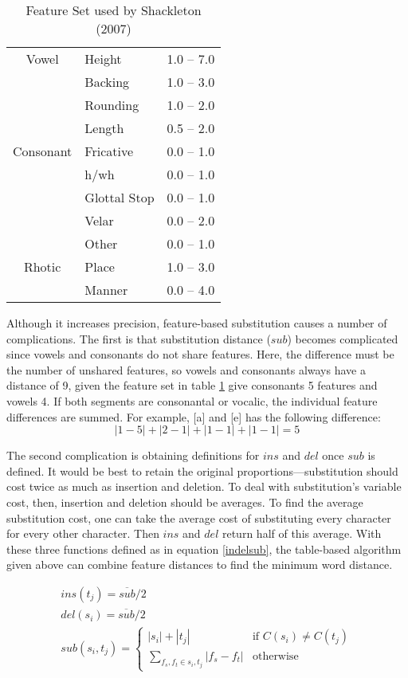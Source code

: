 \documentclass[11pt]{article}
\begin{document}
\begin{table}
\begin{tabular}{c|lr}
Vowel & Height & 1.0 -- 7.0 \\
  & Backing & 1.0 -- 3.0 \\
  & Rounding & 1.0 -- 2.0 \\
  & Length & 0.5 -- 2.0 \\ \hline
Consonant & Fricative & 0.0 -- 1.0 \\
  & h/wh & 0.0 -- 1.0 \\
  & Glottal  Stop &0.0 -- 1.0 \\
  & Velar & 0.0 -- 2.0 \\
  & Other & 0.0 -- 1.0 \\ \hline
Rhotic & Place & 1.0 -- 3.0 \\
  & Manner & 0.0 -- 4.0 \\
\end{tabular}
\caption{Feature Set used by Shackleton (2007)}
\label{featureset}
\end{table}

Although it increases precision, feature-based substitution causes a
number of complications. The first is that substitution distance
($sub$) becomes complicated since vowels and consonants do not share
features.  Here, the difference must be the number of unshared
features, so vowels and consonants always have a distance of 9, given
the feature set in table \ref{featureset} give consonants 5 features
and vowels 4.  If both segments are consonantal or vocalic, the
individual feature differences are summed.  For example, [a] and [e]
has the following difference: \[ |1-5| + |2-1| + |1-1| + |1-1| = 5 \]

The second complication is obtaining definitions for $ins$ and $del$
once $sub$ is defined. It would be best to retain the original
proportions---substitution should cost twice as much as insertion and
deletion. To deal with substitution's variable cost, then, insertion and
deletion should be averages. To find the average substitution cost, one can
 take the average cost of substituting every character
for every other character. Then $ins$ and $del$ return half of this
average. With these three functions defined as in equation
\ref{indelsub}, the table-based algorithm
given above can combine feature distances to find the minimum word distance.

\begin{equation}\begin{array}{l}
   ins(t_j) = \overline{sub} / 2 \\
   del(s_i) = \overline{sub} / 2 \\
   sub(s_i,t_j) = \left\{
     \begin{array}{ll}
       |s_i|+|t_j| & \textrm{if $C(s_i) \ne C(t_j)$} \\
       \sum_{f_s,f_t \in s_i,t_j} |f_s - f_t| & \textrm{otherwise}
     \end{array} \right.

   \end{array}
\label{indelsub}
\end{equation}
\end{document}
